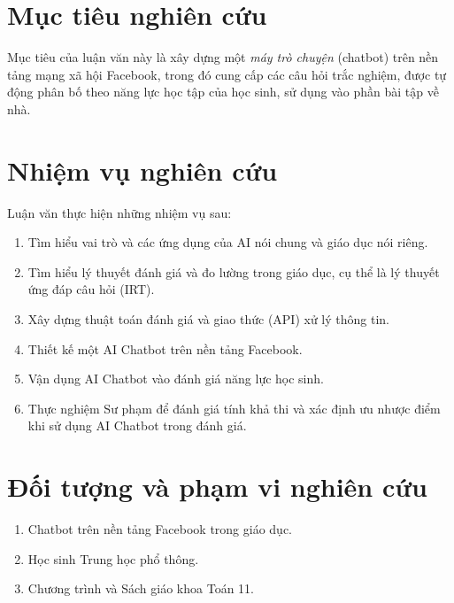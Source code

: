 \section{Mục tiêu nghiên cứu}
Mục tiêu của luận văn này là xây dựng một \textit{máy trò chuyện} (chatbot) trên nền tảng mạng xã hội Facebook, trong đó cung cấp các câu hỏi trắc nghiệm, được tự động phân bố theo năng lực học tập của học sinh, sử dụng vào phần bài tập về nhà.
\section{Nhiệm vụ nghiên cứu}
Luận văn thực hiện những nhiệm vụ sau:\par
\begin{enumerate}[label=\textbf{(\arabic*)},align=left,left=1cm..0cm,itemindent=*]
	\item Tìm hiểu vai trò và các ứng dụng của AI nói chung và giáo dục nói riêng.
	\item Tìm hiểu lý thuyết đánh giá và đo lường trong giáo dục, cụ thể là lý thuyết ứng đáp câu hỏi (IRT).
	\item Xây dựng thuật toán đánh giá và giao thức (API) xử lý thông tin.
	\item Thiết kế một AI Chatbot trên nền tảng Facebook.
	\item Vận dụng AI Chatbot vào đánh giá năng lực học sinh.
	\item Thực nghiệm Sư phạm để đánh giá tính khả thi và xác định ưu nhược điểm khi sử dụng AI Chatbot trong đánh giá.
\end{enumerate}\par

\section{Đối tượng và phạm vi nghiên cứu}
\begin{enumerate}[label=\textbf{(\arabic*)},align=left,left=1cm..0cm,itemindent=*]
	\item Chatbot trên nền tảng Facebook trong giáo dục.
	\item Học sinh Trung học phổ thông.
	\item Chương trình và Sách giáo khoa Toán 11.
\end{enumerate}

